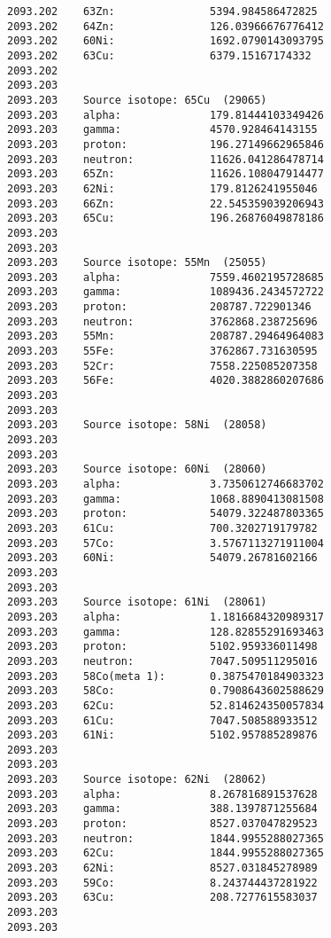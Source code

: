 \begin{lstlisting}[style=sOutputFile,caption={Final results for steel irradiation},label={listing:alexsteel}]
2093.202    63Zn:               5394.984586472825
2093.202    64Zn:               126.03966676776412
2093.202    60Ni:               1692.0790143093795
2093.202    63Cu:               6379.15167174332
2093.202    
2093.203    
2093.203    Source isotope: 65Cu  (29065)
2093.203    alpha:              179.81444103349426
2093.203    gamma:              4570.928464143155
2093.203    proton:             196.27149662965846
2093.203    neutron:            11626.041286478714
2093.203    65Zn:               11626.108047914477
2093.203    62Ni:               179.8126241955046
2093.203    66Zn:               22.545359039206943
2093.203    65Cu:               196.26876049878186
2093.203    
2093.203    
2093.203    Source isotope: 55Mn  (25055)
2093.203    alpha:              7559.4602195728685
2093.203    gamma:              1089436.2434572722
2093.203    proton:             208787.722901346
2093.203    neutron:            3762868.238725696
2093.203    55Mn:               208787.29464964083
2093.203    55Fe:               3762867.731630595
2093.203    52Cr:               7558.225085207358
2093.203    56Fe:               4020.3882860207686
2093.203    
2093.203    
2093.203    Source isotope: 58Ni  (28058)
2093.203    
2093.203    
2093.203    Source isotope: 60Ni  (28060)
2093.203    alpha:              3.7350612746683702
2093.203    gamma:              1068.8890413081508
2093.203    proton:             54079.322487803365
2093.203    61Cu:               700.3202719179782
2093.203    57Co:               3.5767113271911004
2093.203    60Ni:               54079.26781602166
2093.203    
2093.203    
2093.203    Source isotope: 61Ni  (28061)
2093.203    alpha:              1.1816684320989317
2093.203    gamma:              128.82855291693463
2093.203    proton:             5102.959336011498
2093.203    neutron:            7047.509511295016
2093.203    58Co(meta 1):       0.3875470184903323
2093.203    58Co:               0.7908643602588629
2093.203    62Cu:               52.814624350057834
2093.203    61Cu:               7047.508588933512
2093.203    61Ni:               5102.957885289876
2093.203    
2093.203    
2093.203    Source isotope: 62Ni  (28062)
2093.203    alpha:              8.267816891537628
2093.203    gamma:              388.1397871255684
2093.203    proton:             8527.037047829523
2093.203    neutron:            1844.9955288027365
2093.203    62Cu:               1844.9955288027365
2093.203    62Ni:               8527.031845278989
2093.203    59Co:               8.243744437281922
2093.203    63Cu:               208.7277615583037
2093.203    
2093.203    

\end{lstlisting}
